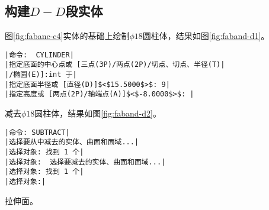 \subsection{构建$D-D$段实体}
\begin{procedure}
\item 图\ref{fig:fabanc-c4}实体的基础上绘制$\phi 18$圆柱体，结果如图\ref{fig:faband-d1}。
\begin{lstlisting}
|命令:  CYLINDER|
|指定底面的中心点或 [三点(3P)/两点(2P)/切点、切点、半径(T)|
|/椭圆(E)]:int 于|
|指定底面半径或 [直径(D)]$<$15.5000$>$: 9|
|指定高度或 [两点(2P)/轴端点(A)]$<$-8.0000$>$: |
\end{lstlisting}
\item 减去$\phi 18$圆柱体，结果如图\ref{fig:faband-d2}。
\begin{lstlisting}
|命令: SUBTRACT|
|选择要从中减去的实体、曲面和面域...|
|选择对象: 找到 1 个|
|选择对象:  选择要减去的实体、曲面和面域...|
|选择对象: 找到 1 个|
|选择对象:|
\end{lstlisting}
\begin{figure}[htbp]
\centering
\begin{floatrow}[3]
\end{floatrow}
\end{figure}

\item 拉伸面。


\end{procedure}
